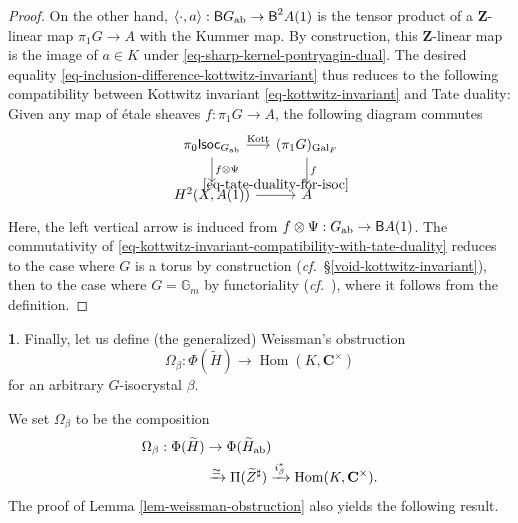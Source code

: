 \documentclass[10pt,english,reqno]{amsart}
\newcommand{\integers}{\mathbf Z}
\newcommand{\complexes}{\mathbf C}
\newcommand{\Isoc}{\textnormal{\textsf{Isoc}}}
\newcommand{\Gal}{\operatorname{Gal}}
\newcommand{\Kottwitz}{\textnormal{Kott}}
\newcommand{\Hom}{\operatorname{Hom}}
\newcommand{\deloop}{\textnormal{\textsf{B}}}
\newcommand{\abelian}{\textnormal{ab}}
\theoremstyle{definition}
\numberwithin{equation}{section}
\newtheorem{untitledsubsubsection}[subsubsection]{}
\newenvironment{void}
{\begin{untitledsubsubsection}}
{\end{untitledsubsubsection}}
\begin{document}
\begin{proof}
On the other hand, $\langle\cdot, a\rangle : \deloop G_{\abelian} \rightarrow \deloop^2A(1)$ is the tensor product of a $\integers$-linear map $\pi_1 G \rightarrow A$ with the Kummer map. By construction, this $\integers$-linear map is the image of $a\in K$ under \eqref{eq-sharp-kernel-pontryagin-dual}. The desired equality \eqref{eq-inclusion-difference-kottwitz-invariant} thus reduces to the following compatibility between Kottwitz invariant \eqref{eq-kottwitz-invariant} and Tate duality: Given any map of \'etale sheaves $f : \pi_1 G \rightarrow A$, the following diagram commutes
\begin{equation}
\label{eq-kottwitz-invariant-compatibility-with-tate-duality}
\begin{tikzcd}[column sep = 1em]
	\pi_0\Isoc_{G_{\abelian}} \ar[r, "\Kottwitz"]\ar[d, "f \otimes \Psi"] & (\pi_1 G)_{\Gal_F} \ar[d, "f"] \\
	H^2(X, A(1)) \ar[r, "\eqref{eq-tate-duality-for-isoc}"] & A
\end{tikzcd}
\end{equation}
Here, the left vertical arrow is induced from $f\otimes \Psi : G_{\abelian} \rightarrow \deloop A(1)$. The commutativity of \eqref{eq-kottwitz-invariant-compatibility-with-tate-duality} reduces to the case where $G$ is a torus by construction (\emph{cf.}~\S\ref{void-kottwitz-invariant}), then to the case where $G = \mathbb G_m$ by functoriality (\emph{cf.}~\cite[\S2]{MR809866}), where it follows from the definition.
\end{proof}


\begin{void}
Finally, let us define (the generalized) Weissman's obstruction
$$
\Omega_{\beta} : \Phi(\widetilde H) \rightarrow \Hom(K, \complexes^{\times})
$$
for an arbitrary $G$-isocrystal $\beta$.

We set $\Omega_{\beta}$ to be the composition
\begin{align*}
\Omega_{\beta} : \Phi(\widetilde H) & \rightarrow \Phi(\widetilde H_{\abelian}) \\
& \xrightarrow{\simeq} \Pi(\widetilde Z^{\sharp}) \xrightarrow{i_{\beta}^*} \Hom(K, \complexes^{\times}).
\end{align*}
The proof of Lemma \ref{lem-weissman-obstruction} also yields the following result.
\end{void}

\end{document}
